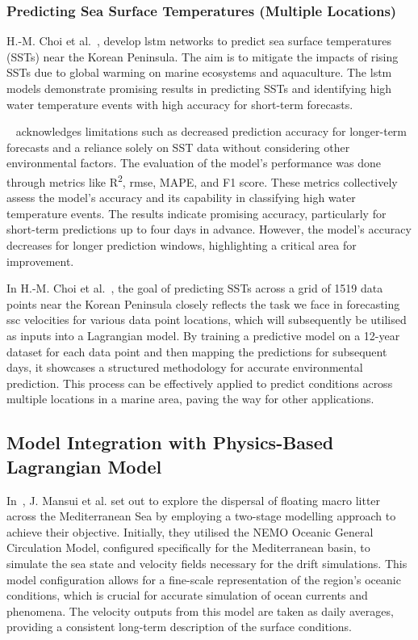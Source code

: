\subsubsection{Predicting Sea Surface Temperatures (Multiple Locations)}
\label{subsubsec:2.2.2.2}

H.-M. Choi et al.~\cite{44}, develop \acrshort{lstm} networks to predict sea surface temperatures (SSTs) near the Korean Peninsula. The aim is to mitigate the impacts of rising SSTs due to global warming on marine ecosystems and aquaculture. The \acrshort{lstm} models demonstrate promising results in predicting SSTs and identifying high water temperature events with high accuracy for short-term forecasts.

~\cite{44} acknowledges limitations such as decreased prediction accuracy for longer-term forecasts and a reliance solely on SST data without considering other environmental factors. The evaluation of the model's performance was done through metrics like R\textsuperscript{2}, \acrshort{rmse}, MAPE, and F1 score. These metrics collectively assess the model's accuracy and its capability in classifying high water temperature events. The results indicate promising accuracy, particularly for short-term predictions up to four days in advance. However, the model's accuracy decreases for longer prediction windows, highlighting a critical area for improvement.
 
In H.-M. Choi et al.~\cite{44}, the goal of predicting SSTs across a grid of 1519 data points near the Korean Peninsula closely reflects the task we face in forecasting \acrshort{ssc} velocities for various data point locations, which will subsequently be utilised as inputs into a Lagrangian model. By training a predictive model on a 12-year dataset for each data point and then mapping the predictions for subsequent days, it showcases a structured methodology for accurate environmental prediction. This process can be effectively applied to predict conditions across multiple locations in a marine area, paving the way for other applications. 

\subsection{Model Integration with Physics-Based Lagrangian Model}
\label{subsec:2.2.3}

In~\cite{45}, J. Mansui et al. set out to explore the dispersal of floating macro litter across the Mediterranean Sea by employing a two-stage modelling approach to achieve their objective. Initially, they utilised the NEMO Oceanic General Circulation Model, configured specifically for the Mediterranean basin, to simulate the sea state and velocity fields necessary for the drift simulations. This model configuration allows for a fine-scale representation of the region's oceanic conditions, which is crucial for accurate simulation of ocean currents and phenomena. The velocity outputs from this model are taken as daily averages, providing a consistent long-term description of the surface conditions.

